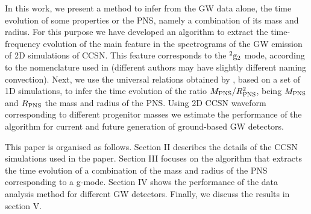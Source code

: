{In this work, we present a method to infer from the GW data alone, the time evolution of some properties or the PNS, namely a combination of its mass and radius. For this purpose we have developed an algorithm to  
extract the time-frequency evolution of the main feature in the spectrograms of the GW emission of 2D simulations of CCSN. This feature corresponds to the $^2\rm{g}_2$ mode, according to the nomenclature used in \cite{Torres:2019b} (different authors may have slightly different naming convection). Next, we use the universal relations obtained by \cite{Torres:2019b}{, based on a set of 1D simulations,} to infer the time evolution of the ratio $M_{\rm PNS}/R_{\rm PNS}^2$, being 
$M_{\rm PNS}$ and $R_{\rm PNS}$ the mass and radius of the PNS.} Using 2D CCSN waveform corresponding to different progenitor masses we estimate the performance of the algorithm for current and future generation of ground-based GW detectors.

This paper is organised as follows. Section II describes the details of the CCSN simulations used in the paper. Section III focuses on the algorithm that extracts the time evolution of a combination of the mass and radius of the PNS corresponding to a g-mode. Section IV shows the performance of the data analysis method for different GW detectors. Finally, we discuss the results in section V.


